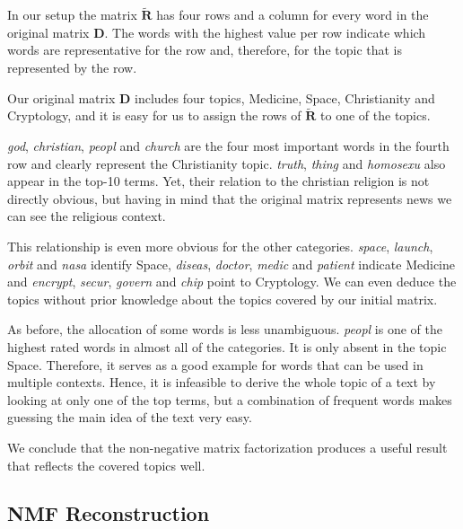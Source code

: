 \documentclass{support/acm_proc_article-sp}
\begin{document}
    In our setup the matrix $\mathbf{\tilde{R}}$ has four rows and a column for every word in the original matrix
    $\mathbf{D}$.
    The words with the highest value per row indicate which words are representative for the row and, therefore, for
    the topic that is represented by the row.

    Our original matrix $\mathbf{D}$ includes four topics, Medicine, Space, Christianity and Cryptology, and it is easy
    for us to assign the rows of $\mathbf{\tilde{R}}$ to one of the topics.

    \emph{god}, \emph{christian}, \emph{peopl} and \emph{church} are the four most important words in the fourth row and
    clearly represent the Christianity topic.
    \emph{truth}, \emph{thing} and \emph{homosexu} also appear in the top-10 terms.
    Yet, their relation to the christian religion is not directly obvious, but having in mind that the original matrix
    represents news we can see the religious context.

    This relationship is even more obvious for the other categories. \emph{space}, \emph{launch}, \emph{orbit} and
    \emph{nasa} identify Space, \emph{diseas}, \emph{doctor}, \emph{medic} and \emph{patient} indicate Medicine and
    \emph{encrypt}, \emph{secur}, \emph{govern} and \emph{chip} point to Cryptology.
    We can even deduce the topics without prior knowledge about the topics covered by our initial matrix.

    As before, the allocation of some words is less unambiguous.
    \emph{peopl} is one of the highest rated words in almost all of the categories.
    It is only absent in the topic Space.
    Therefore, it serves as a good example for words that can be used in multiple contexts.
    Hence, it is infeasible to derive the whole topic of a text by looking at only one of the top terms, but a
    combination of frequent words makes guessing the main idea of the text very easy.

    We conclude that the non-negative matrix factorization produces a useful result that reflects the covered topics
    well.


    \subsection{NMF Reconstruction}
\end{document}
